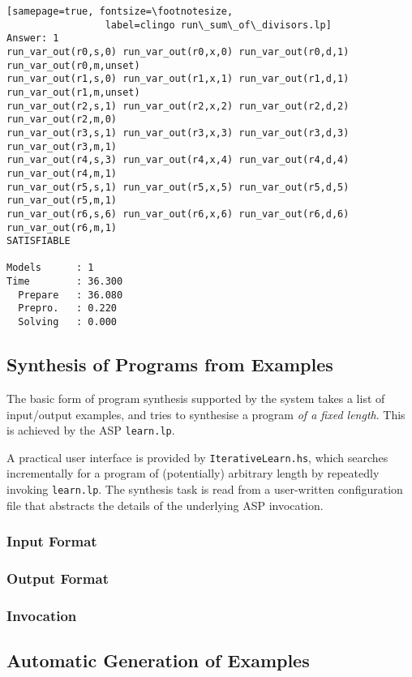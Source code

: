 \documentclass[a4paper,twoside,notitlepage,12pt]{article}
\begin{document}
\begin{verbatim}[samepage=true, fontsize=\footnotesize,
                 label=clingo run\_sum\_of\_divisors.lp]
Answer: 1
run_var_out(r0,s,0) run_var_out(r0,x,0) run_var_out(r0,d,1) run_var_out(r0,m,unset)
run_var_out(r1,s,0) run_var_out(r1,x,1) run_var_out(r1,d,1) run_var_out(r1,m,unset)
run_var_out(r2,s,1) run_var_out(r2,x,2) run_var_out(r2,d,2) run_var_out(r2,m,0)
run_var_out(r3,s,1) run_var_out(r3,x,3) run_var_out(r3,d,3) run_var_out(r3,m,1)
run_var_out(r4,s,3) run_var_out(r4,x,4) run_var_out(r4,d,4) run_var_out(r4,m,1)
run_var_out(r5,s,1) run_var_out(r5,x,5) run_var_out(r5,d,5) run_var_out(r5,m,1)
run_var_out(r6,s,6) run_var_out(r6,x,6) run_var_out(r6,d,6) run_var_out(r6,m,1)
SATISFIABLE

Models      : 1     
Time        : 36.300
  Prepare   : 36.080
  Prepro.   : 0.220
  Solving   : 0.000
\end{verbatim}

\subsection{Synthesis of Programs from Examples} \label{sec:psynx}

The basic form of program synthesis supported by the system takes a list of 
input/output examples, and tries to synthesise a program \emph{of a fixed length}. This 
is achieved by the ASP \verb|learn.lp|.

A practical user interface is provided by \verb|IterativeLearn.hs|, which searches 
incrementally for a program of (potentially) arbitrary length by repeatedly invoking 
\verb|learn.lp|. The synthesis task is read from a user-written configuration file that 
abstracts the details of the underlying ASP invocation.

\subsubsection{Input Format}



\subsubsection{Output Format}

\subsubsection{Invocation}

\subsection{Automatic Generation of Examples} \label{sec:pgenx}
\end{document}
